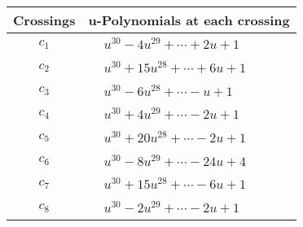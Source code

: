 \documentclass[1p]{elsarticle_modified}
\theoremstyle{definition}
\begin{document}
\begin{tabular}{m{50pt}|m{274pt}}
Crossings & \hspace{64pt}u-Polynomials at each crossing \\
\hline $$\begin{aligned}c_{1}\end{aligned}$$&$\begin{aligned}
&u^{30}-4 u^{29}+\cdots+2 u+1
\end{aligned}$\\
\hline $$\begin{aligned}c_{2}\end{aligned}$$&$\begin{aligned}
&u^{30}+15 u^{28}+\cdots+6 u+1
\end{aligned}$\\
\hline $$\begin{aligned}c_{3}\end{aligned}$$&$\begin{aligned}
&u^{30}-6 u^{28}+\cdots- u+1
\end{aligned}$\\
\hline $$\begin{aligned}c_{4}\end{aligned}$$&$\begin{aligned}
&u^{30}+4 u^{29}+\cdots-2 u+1
\end{aligned}$\\
\hline $$\begin{aligned}c_{5}\end{aligned}$$&$\begin{aligned}
&u^{30}+20 u^{28}+\cdots-2 u+1
\end{aligned}$\\
\hline $$\begin{aligned}c_{6}\end{aligned}$$&$\begin{aligned}
&u^{30}-8 u^{29}+\cdots-24 u+4
\end{aligned}$\\
\hline $$\begin{aligned}c_{7}\end{aligned}$$&$\begin{aligned}
&u^{30}+15 u^{28}+\cdots-6 u+1
\end{aligned}$\\
\hline $$\begin{aligned}c_{8}\end{aligned}$$&$\begin{aligned}
&u^{30}-2 u^{29}+\cdots-2 u+1
\end{aligned}$\\

\end{tabular}
\end{document}

